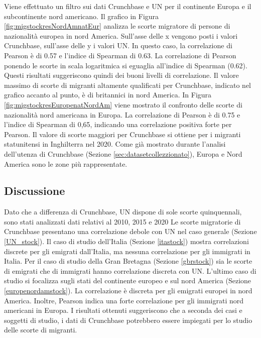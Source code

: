 Viene effettuato un filtro sui dati Crunchbase e UN per il continente Europa e il subcontinente nord americano. Il grafico in Figura \ref{fig:migstockresNordAmnatEur} analizza le scorte migratore di persone di nazionalità europea in nord America. Sull'asse delle x vengono posti i valori Crunchbase, sull'asse delle y i valori UN. In questo caso, la correlazione di Pearson è di 0.57 e l'indice di Spearman di 0.63. La correlazione di Pearson ponendo le scorte in scala logaritmica si eguaglia all'indice di Spearman (0.62).
Questi risultati suggeriscono quindi dei buoni livelli di correlazione. Il valore massimo di scorte di migranti altamente qualificati per Crunchbase, indicato nel grafico accanto al punto, è di britannici in nord America.
In Figura \ref{fig:migstockresEuropenatNordAm} viene mostrato il confronto delle scorte di nazionalità nord americana in Europa. 
La correlazione di Pearson è di 0.75 e l'indice di Spearman di 0,65, indicando una correlazione positiva forte per Pearson. Il valore di scorte maggiori per Crunchbase si ottiene per i migranti statunitensi in Inghilterra nel 2020.
Come già mostrato durante l'analisi dell'utenza di Crunchbase (Sezione \ref{sec:datasetcollezzionato}), Europa e Nord America sono le zone più rappresentate.
\FloatBarrier

\subsection{Discussione}
Dato che a differenza di Crunchbase, UN dispone di sole scorte quinquennali, sono stati analizzati dati relativi al 2010, 2015 e 2020
Le scorte migratorie di Crunchbase presentano una correlazione debole con UN nel caso generale (Sezione \ref{UN_stock}).
Il caso di studio dell'Italia (Sezione \ref{itastock}) mostra correlazioni discrete per gli emigrati dall'Italia, ma nessuna correlazione per gli immigrati in Italia.
Per il caso di studio della Gran Bretagna (Sezione \ref{gbrstock}) sia le scorte di emigrati che di immigrati hanno correlazione discreta con UN.
L'ultimo caso di studio si focalizza sugli stati del continente europeo e sul nord America (Sezione \ref{europenordamstock}). La correlazione è discreta per gli emigrati europei in nord America. Inoltre, Pearson indica una forte correlazione per gli immigrati nord americani in Europa. 
I risultati ottenuti suggeriscono che a seconda dei casi e soggetti di studio, i dati di Crunchbase potrebbero essere impiegati per lo studio delle scorte di migranti. 

